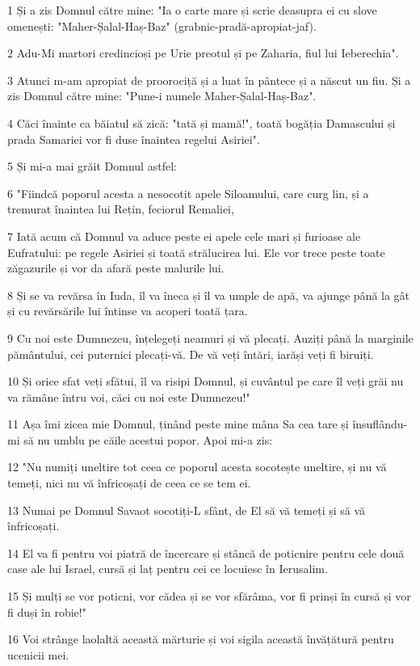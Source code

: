 \par 1 Și a zis Domnul către mine: "Ia o carte mare și scrie deasupra ei cu slove omenești: "Maher-Șalal-Haș-Baz" (grabnic-pradă-apropiat-jaf).
\par 2 Adu-Mi martori credincioși pe Urie preotul și pe Zaharia, fiul lui Ieberechia".
\par 3 Atunci m-am apropiat de proorociță și a luat în pântece și a născut un fiu. Și a zis Domnul către mine: "Pune-i numele Maher-Șalal-Haș-Baz".
\par 4 Căci înainte ca băiatul să zică: "tată și mamă!", toată bogăția Damascului și prada Samariei vor fi duse înaintea regelui Asiriei".
\par 5 Și mi-a mai grăit Domnul astfel:
\par 6 "Fiindcă poporul acesta a nesocotit apele Siloamului, care curg lin, și a tremurat înaintea lui Rețin, feciorul Remaliei,
\par 7 Iată acum că Domnul va aduce peste ei apele cele mari și furioase ale Eufratului: pe regele Asiriei și toată strălucirea lui. Ele vor trece peste toate zăgazurile și vor da afară peste malurile lui.
\par 8 Și se va revărsa în Iuda, îl va îneca și îl va umple de apă, va ajunge până la gât și cu revărsările lui întinse va acoperi toată țara.
\par 9 Cu noi este Dumnezeu, înțelegeți neamuri și vă plecați. Auziți până la marginile pământului, cei puternici plecați-vă. De vă veți întări, iarăși veți fi biruiți.
\par 10 Și orice sfat veți sfătui, îl va risipi Domnul, și cuvântul pe care îl veți grăi nu va rămâne întru voi, căci cu noi este Dumnezeu!"
\par 11 Așa îmi zicea mie Domnul, ținând peste mine mâna Sa cea tare și însuflându-mi să nu umblu pe căile acestui popor. Apoi mi-a zis:
\par 12 "Nu numiți uneltire tot ceea ce poporul acesta socotește uneltire, și nu vă temeți, nici nu vă înfricoșați de ceea ce se tem ei.
\par 13 Numai pe Domnul Savaot socotiți-L sfânt, de El să vă temeți și să vă înfricoșați.
\par 14 El va fi pentru voi piatră de încercare și stâncă de poticnire pentru cele două case ale lui Israel, cursă și laț pentru cei ce locuiesc în Ierusalim.
\par 15 Și mulți se vor poticni, vor cădea și se vor sfărâma, vor fi prinși în cursă și vor fi duși în robie!"
\par 16 Voi strânge laolaltă această mărturie și voi sigila această învățătură pentru ucenicii mei.
